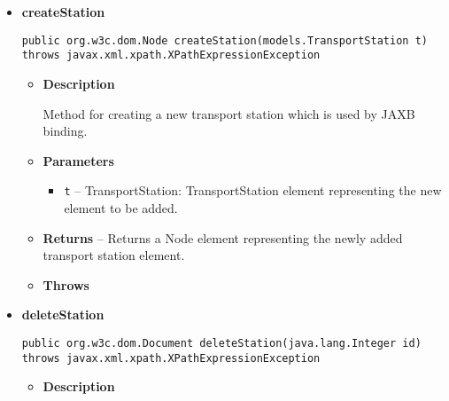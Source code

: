 \documentclass[11pt,a4paper]{report}
\begin{document}
{{{{{{{\begin{itemize}
{\begin{itemize}
{\begin{itemize}
  \end{itemize}
}%
\end{itemize}
}%
\item{ 
\hypertarget{core.StationsInteractor.createStation(models.TransportStation)}{{\bf  createStation}\\}
\begin{lstlisting}[frame=none]
public org.w3c.dom.Node createStation(models.TransportStation t) throws javax.xml.xpath.XPathExpressionException\end{lstlisting} %
\begin{itemize}
\item{
{\bf  Description}

Method for creating a new transport station which is used by JAXB binding.
}
\item{
{\bf  Parameters}
  \begin{itemize}
   \item{
\texttt{t} -- TransportStation: TransportStation element representing the new element to be added.}
  \end{itemize}
}%
\item{{\bf  Returns} -- 
Returns a Node element representing the newly added transport station element. 
}%
\item{{\bf  Throws}
}%
\end{itemize}
}%
\item{ 
\hypertarget{core.StationsInteractor.deleteStation(java.lang.Integer)}{{\bf  deleteStation}\\}
\begin{lstlisting}[frame=none]
public org.w3c.dom.Document deleteStation(java.lang.Integer id) throws javax.xml.xpath.XPathExpressionException\end{lstlisting} %
\begin{itemize}
\item{
{\bf  Description}

}
\end{itemize}}
\end{itemize}}}}}}}}
\end{document}
